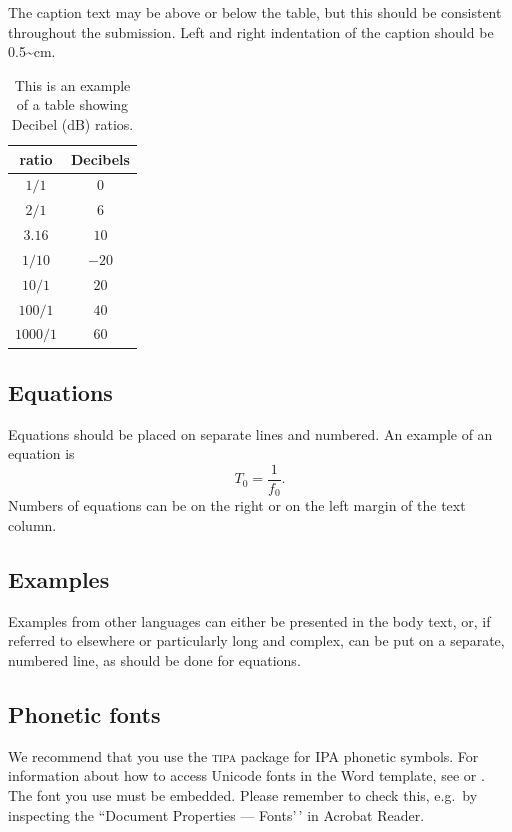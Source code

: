 \documentclass[
  a4paper,
  11pt,
  twocolumn]{article}
\begin{document}
The caption text may be above or below the table, but this should be
consistent throughout the submission. Left and right indentation of the
caption should be 0.5\textasciitilde cm.

\begin{table}[!ht]
  \begin{center}
  \begin{tabular}{|c|c|}
  \hline
  \rowcolor[gray]{.75}
  ratio    & Decibels\\
  \hline
  $1/1$    & $0$\\
  $2/1$    & $6$\\
  $3.16$   & $10$\\
  $1/10$   & $-20$\\
  $10/1$   & $20$\\
  $100/1$  & $40$\\
  $1000/1$ & $60$\\
  \hline
  \end{tabular}
  \caption{This is an example of a table showing Decibel (dB)
  ratios.}\label{tab:decibel}
  \end{center}
\end{table}

\subsection{Equations}

Equations should be placed on separate lines and numbered. An example of
an equation is \begin{equation}\label{eq:tzero}
T_0 = \frac{1}{f_0}.
\end{equation} Numbers of equations can be on the right or on the left
margin of the text column.

\subsection{Examples}

Examples from other languages can either be presented in the body text,
or, if referred to elsewhere or particularly long and complex, can be
put on a separate, numbered line, as should be done for equations.

\subsection{Phonetic fonts}

We recommend that you use the \textsc{tipa} package for IPA phonetic
symbols. For information about how to access Unicode fonts in the Word
template, see \cite{IPA-SIL} or \cite{IPA-KEYBOARD}. The font you use
must be embedded. Please remember to check this, e.g.~by inspecting the
``Document Properties --- Fonts'\,' in Acrobat Reader.
\end{document}
